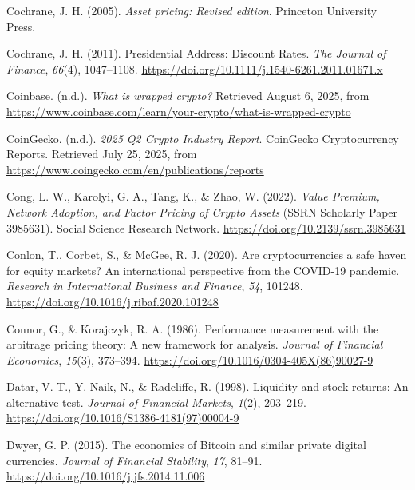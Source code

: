 \documentclass[
  12pt,
  a4paper,
  openany]{scrbook}
\newlength{\cslhangindent}
\newenvironment{CSLReferences}[2] %
 {\begin{list}{}{%
  \setlength{\itemindent}{0pt}
  \setlength{\leftmargin}{0pt}
  \setlength{\parsep}{0pt}
  \ifodd #1
   \setlength{\leftmargin}{\cslhangindent}
   \setlength{\itemindent}{-1\cslhangindent}
  \fi
  \setlength{\itemsep}{#2\baselineskip}}}
 {\end{list}}
\begin{document}
\begin{CSLReferences}{1}{0}
Cochrane, J. H. (2005). \emph{Asset pricing: Revised edition}. Princeton
University Press.

Cochrane, J. H. (2011). Presidential Address: Discount Rates. \emph{The
Journal of Finance}, \emph{66}(4), 1047--1108.
\url{https://doi.org/10.1111/j.1540-6261.2011.01671.x}

Coinbase. (n.d.). \emph{What is wrapped crypto?} Retrieved August 6,
2025, from
\url{https://www.coinbase.com/learn/your-crypto/what-is-wrapped-crypto}

CoinGecko. (n.d.). \emph{2025 Q2 Crypto Industry Report}. CoinGecko
Cryptocurrency Reports. Retrieved July 25, 2025, from
\url{https://www.coingecko.com/en/publications/reports}

Cong, L. W., Karolyi, G. A., Tang, K., \& Zhao, W. (2022). \emph{Value
Premium, Network Adoption, and Factor Pricing of Crypto Assets} (SSRN
Scholarly Paper 3985631). Social Science Research Network.
\url{https://doi.org/10.2139/ssrn.3985631}

Conlon, T., Corbet, S., \& McGee, R. J. (2020). Are cryptocurrencies a
safe haven for equity markets? An international perspective from the
COVID-19 pandemic. \emph{Research in International Business and
Finance}, \emph{54}, 101248.
\url{https://doi.org/10.1016/j.ribaf.2020.101248}

Connor, G., \& Korajczyk, R. A. (1986). Performance measurement with the
arbitrage pricing theory: A new framework for analysis. \emph{Journal of
Financial Economics}, \emph{15}(3), 373--394.
\url{https://doi.org/10.1016/0304-405X(86)90027-9}

Datar, V. T., Y. Naik, N., \& Radcliffe, R. (1998). Liquidity and stock
returns: An alternative test. \emph{Journal of Financial Markets},
\emph{1}(2), 203--219.
\url{https://doi.org/10.1016/S1386-4181(97)00004-9}

Dwyer, G. P. (2015). The economics of Bitcoin and similar private
digital currencies. \emph{Journal of Financial Stability}, \emph{17},
81--91. \url{https://doi.org/10.1016/j.jfs.2014.11.006}


\end{CSLReferences}
\end{document}
